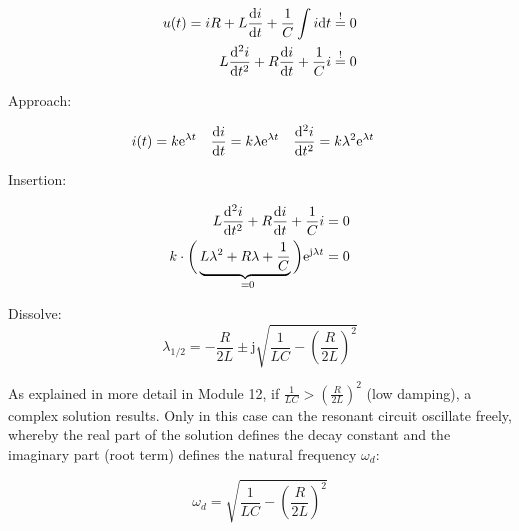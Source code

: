 \begin{frame}
{    \begin{align*}u(t)=
        i R + L \frac{\mathrm{d} i}{\mathrm{d} t} + \frac{1}{C} \int i \mathrm{d} t &\overset{!}{=} 0 \\
        L \frac{\mathrm{d}^2i}{\mathrm{d} t^2} + R \frac{\mathrm{d}i}{\mathrm{d} t} + \frac{1}{C} i &\overset{!}{=} 0 
    \end{align*}

    Approach:

    \begin{align*}
        i(t) 
            &= k \mathrm{e}^{\lambda t}&%
        \frac{\d i}{\d t}
            &= k\lambda \mathrm{e}^{\lambda t}&%
        \frac{\d^2 i}{\d t^2}
            &= k\lambda^2 \mathrm{e}^{\lambda t}
    \end{align*}
    
    Insertion:

    \begin{align*}
        L \frac{\d^2i}{\d t^2} + R \frac{\mathrm{d}i}{\d t} + \frac{1}{C} i &= 0 \\
        k \cdot \bigg( \underbrace{L \lambda^2 + R \lambda + \frac{1}{C}}_{=\mathclap{\ 0}} \bigg) \mathrm{e}^{\mathrm{j} \lambda t} &= 0
    \end{align*}

    Dissolve:
    \begin{equation*}
        \lambda_{1/2} = -\frac{R}{2L} \pm \mathrm{j} \sqrt{\frac{1}{LC} - \left(\frac{R}{2L}\right)^2}
    \end{equation*}

    As explained in more detail in Module 12, if $\frac{1}{LC} > \left(\frac{R}{2L}\right)^2$ (low damping), a complex solution results. 
    Only in this case can the resonant circuit oscillate freely, whereby the real part of the 
    solution defines the decay constant and the imaginary part (root term) defines the natural frequency $\omega_d$:

    \begin{equation*}
        \omega_{d} = \sqrt{\frac{1}{LC} - \left(\frac{R}{2L}\right)^2}
    \end{equation*}
}
\end{frame}


